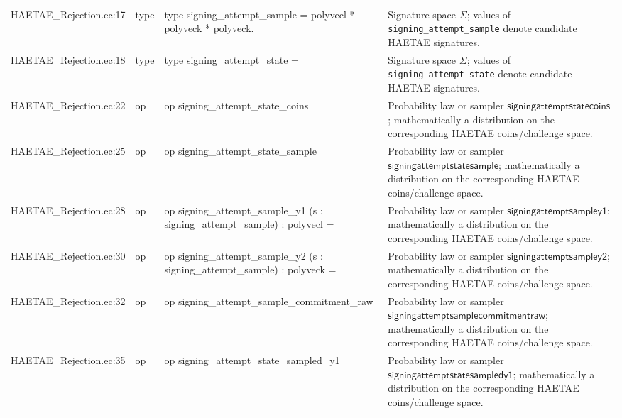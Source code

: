 \documentclass[10pt]{article}
\newcommand{\EC}[1]{\texttt{#1}}
\begin{document}
\begin{longtable}{L{0.11\textwidth}L{0.055\textwidth}L{0.385\textwidth}L{0.41\textwidth}}
HAETAE\_\allowbreak{}Rejection.\allowbreak{}ec:\allowbreak{}17 & type & {\ttfamily\scriptsize type signing\_\allowbreak{}attempt\_\allowbreak{}sample = polyvecl * polyveck * polyveck.} & Signature space $\Sigma$; values of \EC{signing\_attempt\_sample} denote candidate HAETAE signatures. \\
HAETAE\_\allowbreak{}Rejection.\allowbreak{}ec:\allowbreak{}18 & type & {\ttfamily\scriptsize type signing\_\allowbreak{}attempt\_\allowbreak{}state =} & Signature space $\Sigma$; values of \EC{signing\_attempt\_state} denote candidate HAETAE signatures. \\
HAETAE\_\allowbreak{}Rejection.\allowbreak{}ec:\allowbreak{}22 & op & {\ttfamily\scriptsize op signing\_\allowbreak{}attempt\_\allowbreak{}state\_\allowbreak{}coins} & Probability law or sampler $\mathsf{signingattemptstatecoins}$; mathematically a distribution on the corresponding HAETAE coins/challenge space. \\
HAETAE\_\allowbreak{}Rejection.\allowbreak{}ec:\allowbreak{}25 & op & {\ttfamily\scriptsize op signing\_\allowbreak{}attempt\_\allowbreak{}state\_\allowbreak{}sample} & Probability law or sampler $\mathsf{signingattemptstatesample}$; mathematically a distribution on the corresponding HAETAE coins/challenge space. \\
HAETAE\_\allowbreak{}Rejection.\allowbreak{}ec:\allowbreak{}28 & op & {\ttfamily\scriptsize op signing\_\allowbreak{}attempt\_\allowbreak{}sample\_\allowbreak{}y1 (s : signing\_\allowbreak{}attempt\_\allowbreak{}sample) : polyvecl =} & Probability law or sampler $\mathsf{signingattemptsampley1}$; mathematically a distribution on the corresponding HAETAE coins/challenge space. \\
HAETAE\_\allowbreak{}Rejection.\allowbreak{}ec:\allowbreak{}30 & op & {\ttfamily\scriptsize op signing\_\allowbreak{}attempt\_\allowbreak{}sample\_\allowbreak{}y2 (s : signing\_\allowbreak{}attempt\_\allowbreak{}sample) : polyveck =} & Probability law or sampler $\mathsf{signingattemptsampley2}$; mathematically a distribution on the corresponding HAETAE coins/challenge space. \\
HAETAE\_\allowbreak{}Rejection.\allowbreak{}ec:\allowbreak{}32 & op & {\ttfamily\scriptsize op signing\_\allowbreak{}attempt\_\allowbreak{}sample\_\allowbreak{}commitment\_\allowbreak{}raw} & Probability law or sampler $\mathsf{signingattemptsamplecommitmentraw}$; mathematically a distribution on the corresponding HAETAE coins/challenge space. \\
HAETAE\_\allowbreak{}Rejection.\allowbreak{}ec:\allowbreak{}35 & op & {\ttfamily\scriptsize op signing\_\allowbreak{}attempt\_\allowbreak{}state\_\allowbreak{}sampled\_\allowbreak{}y1} & Probability law or sampler $\mathsf{signingattemptstatesampledy1}$; mathematically a distribution on the corresponding HAETAE coins/challenge space. \\

\end{longtable}
\end{document}

